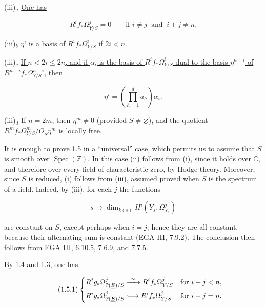 \noindent(iii)$_a$ \underline{One has}

\begin{equation*}
R^if_*\Omega^j_{Y/S}=0
\qquad\underline{\text{if }}i\ne j\ \underline{\text{ and }}\ i+j\ne n.
\end{equation*}


\noindent(iii)$_b$ \underline{$\eta^i$ is a basis of
$R^if_*\Omega^i_{Y/S}$ if $2i<n$.}

\noindent(iii)$_c$ \underline{If $n<2i\leq2n$, and if $\alpha_i$ is the
basis of $R^if_*\Omega^i_{Y/S}$ dual to the basis $\eta^{n-i}$ of
$R^{n-i}f_*\Omega^{n-i}_{Y/S}$, then}

\begin{equation*}
\eta^i=\left(\prod_{h=1}^d a_h\right)\alpha_i.
\end{equation*}

\noindent(iii)$_d$ \underline{If $n=2m$, then $\eta^m\ne0$ (provided
$S\ne\varnothing$), and the quotient
$R^mf_*\Omega^m_{Y/S}/\underline O_S\eta^m$ is locally free.}

It is enough to prove 1.5 in a ``universal'' case, which permits us to
assume that $S$ is smooth over $\operatorname{Spec}(\mathbb Z)$.  In this
case (ii) follows from (i), since it holds over $\mathbb C$, and therefore
over every field of characteristic zero, by Hodge theory.  Moreover, since
$S$ is reduced, (i) follows from (iii), assumed proved when $S$ is the
spectrum of a field.  Indeed, by (iii), for each $j$ the functions

\begin{equation*}
s\longmapsto\dim_{k(s)}H^i(Y_s,\Omega^j_{Y_s})
\end{equation*}

are constant on $S$, except perhaps when $i=j$; hence they are all constant,
because their alternating sum is constant (EGA III, 7.9.2).  The conclusion
then follows from EGA III, 6.10.5, 7.6.9, and 7.7.5.

By 1.4 and 1.3, one has

\begin{equation}\tag{1.5.1}
\left\{
\begin{aligned}
R^ig_*\Omega^j_{\mathbb P(\underline E)/S}
&\xrightarrow{\ \sim\ }R^if_*\Omega^j_{Y/S}
&&\text{for }i+j<n,\\
R^ig_*\Omega^j_{\mathbb P(\underline E)/S}
&\lhook\joinrel\longrightarrow R^if_*\Omega^j_{Y/S}
&&\text{for }i+j=n.
\end{aligned}
\right.
\end{equation}


